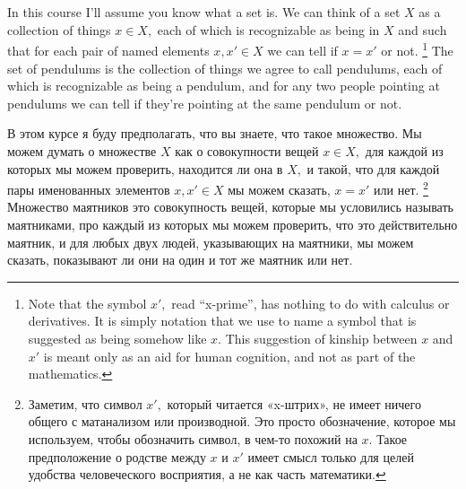 \documentclass[../main/CT4S-EN-RU]{subfiles}
\begin{document}
\section{}


\subsection{}

\begin{blockENG}
In this course I'll assume you know what a set is. We can think of a set $X$ as a collection of things $x\in X,$ each of which is recognizable as being in $X$ and such that for each pair of named elements $x,x'\in X$ we can tell if $x=x'$ or not.%
\footnote{Note that the symbol $x',$ read “x-prime”, has nothing to do with calculus or derivatives. It is simply notation that we use to name a symbol that is suggested as being somehow like $x.$ This suggestion of kinship between $x$ and $x'$ is meant only as an aid for human cognition, and not as part of the mathematics.}
The set of pendulums is the collection of things we agree to call pendulums, each of which is recognizable as being a pendulum, and for any two people pointing at pendulums we can tell if they're pointing at the same pendulum or not. 
\end{blockENG}

\begin{blockRUS}
В этом курсе я буду предполагать, что вы знаете, что такое множество.%
Мы можем думать о множестве $X$ как о совокупности вещей $x\in X,$ для каждой из которых мы можем проверить, находится ли она в $X,$ и такой, что для каждой пары именованных элементов $x,x'\in X$ мы можем сказать, $x=x'$ или нет.%
\footnote{Заметим, что символ $x',$ который читается «x-штрих», не имеет ничего общего с матанализом или производной. Это просто обозначение, которое мы используем, чтобы обозначить символ, в чем-то похожий на $x.$ Такое предположение о родстве между $x$ и $x'$ имеет смысл только для целей удобства человеческого восприятия, а не как часть математики.}
Множество маятников это совокупность вещей, которые мы условились называть маятниками, про каждый из которых мы можем проверить, что это действительно маятник, и для любых двух людей, указывающих на маятники, мы можем сказать, показывают ли они на один и тот же маятник или нет. 
\end{blockRUS}
\end{document}
